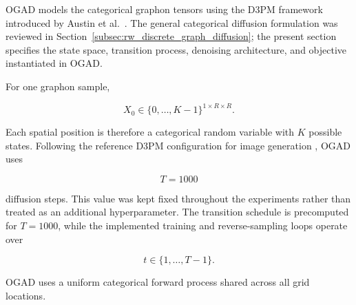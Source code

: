 OGAD models the categorical graphon tensors using the D3PM framework introduced by Austin et al.~\cite{austin2021structured}. The general categorical diffusion formulation was reviewed in Section~\ref{subsec:rw_discrete_graph_diffusion}; the present section specifies the state space, transition process, denoising architecture, and objective instantiated in OGAD.

For one graphon sample,

\[ X_0 \in \{0,\ldots,K-1\}^{1\times R\times R}. \]

Each spatial position is therefore a categorical random variable with \(K\) possible states. Following the reference D3PM configuration for image generation \cite{austin2021structured}, OGAD uses

\[
T=1000
\]

diffusion steps. This value was kept fixed throughout the experiments rather than treated as an additional hyperparameter. The transition schedule is precomputed for \(T=1000\), while the implemented training and reverse-sampling loops operate over

\[
t\in\{1,\ldots,T-1\}.
\]

OGAD uses a uniform categorical forward process shared across all grid locations.

